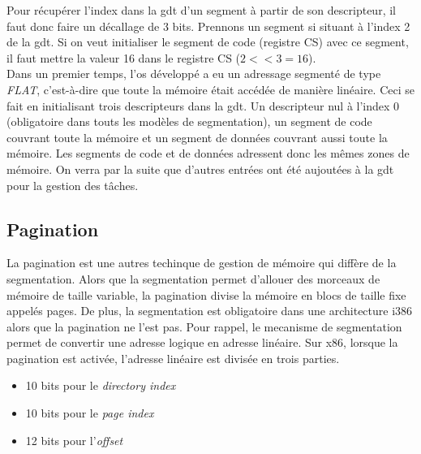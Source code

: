 \documentclass[a4paper, 12pt]{article}
\begin{document}
Pour récupérer l'index dans la \acrshort{gdt} d'un segment à partir de son descripteur,
il faut donc faire un décallage de 3 bits. Prennons un segment si situant à l'index
2 de la \acrshort{gdt}. Si on veut initialiser le segment de code (registre CS)
avec ce segment, il faut mettre la valeur 16 dans le registre CS ($2 << 3 = 16$). \\

Dans un premier temps, l'\acrshort{os} développé a eu un adressage segmenté de type
\textit{FLAT}, c'est-à-dire que toute la mémoire était accédée de manière linéaire.
Ceci se fait en initialisant trois descripteurs dans la \acrshort{gdt}. Un descripteur
nul à l'index 0 (obligatoire dans touts les modèles de segmentation), un segment
de code couvrant toute la mémoire et un segment de données couvrant aussi toute la mémoire.
Les segments de code et de données adressent donc les mêmes zones de mémoire.
On verra par la suite que d'autres entrées ont été aujoutées à la \acrshort{gdt}
pour la gestion des tâches.


\subsection{Pagination}
La pagination est une autres techinque de gestion de mémoire qui diffère de la
segmentation. Alors que la segmentation permet d'allouer des morceaux de mémoire
de taille variable, la pagination divise la mémoire en blocs de taille fixe appelés
pages. De plus, la segmentation est obligatoire dans une architecture i386 alors que
la pagination ne l'est pas\cite{ref16}. Pour rappel, le mecanisme de segmentation
permet de convertir une adresse logique en adresse linéaire. Sur x86, lorsque la
pagination est activée, l'adresse linéaire est divisée en trois parties. 

\begin{itemize}[label=\textbullet]
	\item 10 bits pour le \textit{directory index}
	\item 10 bits pour le \textit{page index}
    \item 12 bits pour l'\textit{offset}
\end{itemize}
\end{document}
